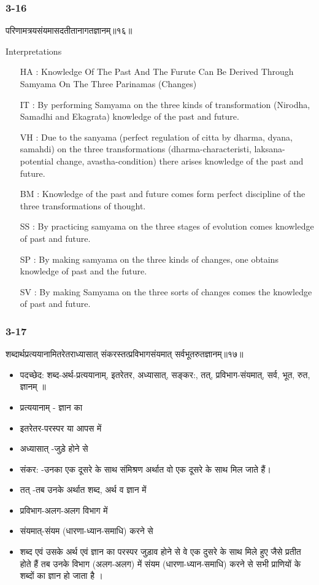 \begin{frame}[fragile]\frametitle{3-16}
\begin{sanskrit}
परिणामत्रयसंयमासदतीतानागतज्ञानम्॥१६॥
\end{sanskrit}

Interpretations
\begin{itemize}	
\item [HA]: Knowledge Of The Past And The Furute Can Be Derived Through Samyama On The Three Parinamas (Changes)
\item [IT]: By performing Samyama on the three kinds of transformation (Nirodha, Samadhi and Ekagrata) knowledge of the past and future.
\item [VH]: Due to the sanyama (perfect regulation of citta by dharma, dyana, samahdi) on the three transformations (dharma-characteristi, laksana-potential change, avastha-condition) there arises knowledge of the past and future.
\item [BM]: Knowledge of the past and future comes form perfect discipline of the three transformations of thought.
\item [SS]: By practicing samyama on the three stages of evolution comes knowledge of past and future.
\item [SP]: By making samyama on the three kinds of changes, one obtains knowledge of past and the future.
\item [SV]: By making Samyama on the three sorts of changes comes the knowledge of past and future. 
\end{itemize}
\end{frame}


\begin{frame}[fragile]\frametitle{3-17}
\begin{sanskrit}
शब्दार्थप्रत्ययानामितरेतराध्यासात् संकरस्तत्प्रविभागसंयमात् सर्वभूतरुतज्ञानम्॥१७॥
\end{sanskrit}

	\begin{itemize}
	\item पदच्छेद:  शब्द-अर्थ-प्रत्ययानाम्, इतरेतर, अध्यासात्‌, सङ्कर:, तत्, प्रविभाग-संयमात्, सर्व, भूत, रुत, ज्ञानम् ॥
	\item प्रत्ययानाम् - ज्ञान का
	\item इतरेतर-परस्पर या आपस में
	\item अध्यासात् -जुड़े होने से
	\item संकर: -उनका एक दूसरे के साथ संमिश्रण अर्थात वो एक दूसरे के साथ मिल जाते हैं।
	\item तत् -तब उनके अर्थात शब्द, अर्थ व ज्ञान में
	\item प्रविभाग-अलग-अलग विभाग में
	\item संयमात्-संयम (धारणा-ध्यान-समाधि) करने से	
	\item शब्द एवं उसके अर्थ एवं ज्ञान का परस्पर जुड़ाव होने से वे एक दुसरे के साथ मिले हुए जैसे प्रतीत होते हैं तब उनके विभाग (अलग-अलग) में संयम (धारणा-ध्यान-समाधि) करने से सभी प्राणियों के शब्दों का ज्ञान हो जाता है ।
	\end{itemize}
\end{frame}

